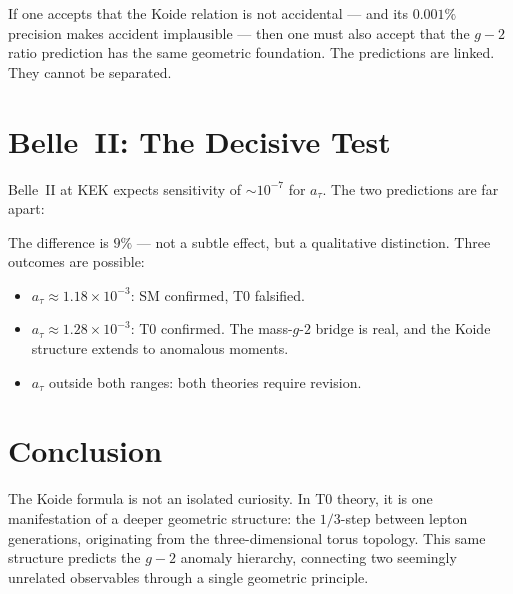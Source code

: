 If one accepts that the Koide relation is not accidental --- and its $0.001\%$ precision makes accident implausible --- then one must also accept that the $g-2$ ratio prediction has the same geometric foundation. The predictions are linked. They cannot be separated.

\section{Belle~II: The Decisive Test}

Belle~II at KEK expects sensitivity of $\sim 10^{-7}$ for $a_\tau$. The two predictions are far apart:

\begin{table}[h]
	\centering
	\caption{Tau anomaly predictions --- Belle~II will distinguish}
\end{table}

The difference is $9\%$ --- not a subtle effect, but a qualitative distinction. Three outcomes are possible:
\begin{itemize}
	\item $a_\tau \approx 1.18 \times 10^{-3}$: SM confirmed, T0 falsified.
	\item $a_\tau \approx 1.28 \times 10^{-3}$: T0 confirmed. The mass-$g$-$2$ bridge is real, and the Koide structure extends to anomalous moments.
	\item $a_\tau$ outside both ranges: both theories require revision.
\end{itemize}

\section{Conclusion}

The Koide formula is not an isolated curiosity. In T0 theory, it is one manifestation of a deeper geometric structure: the $1/3$-step between lepton generations, originating from the three-dimensional torus topology. This same structure predicts the $g-2$ anomaly hierarchy, connecting two seemingly unrelated observables through a single geometric principle.

